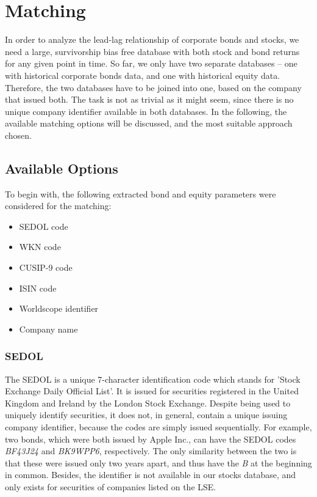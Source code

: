 \chapter{Matching} \label{chapter:matching}
In order to analyze the lead-lag relationship of corporate bonds and stocks, we need a large, survivorship bias free database with both stock and bond returns for any given point in time. So far, we only have two separate databases -- one with historical corporate bonds data, and one with historical equity data. Therefore, the two databases have to be joined into one, based on the company that issued both. The task is not as trivial as it might seem, since there is no unique company identifier available in both databases. In the following, the available matching options will be discussed, and the most suitable approach chosen. 

\section{Available Options} \label{section:available-options}
To begin with, the following extracted bond and equity parameters were considered for the matching: 
\begin{itemize}
	\item SEDOL code
	\item WKN code
	\item CUSIP-9 code
	\item ISIN code
	\item Worldscope identifier
	\item Company name
\end{itemize}

\subsection{SEDOL} %
The SEDOL is a unique 7-character identification code which stands for 'Stock Exchange Daily Official List'. It is issued for securities registered in the United Kingdom and Ireland by the London Stock Exchange. Despite being used to uniquely identify securities, it does not, in general, contain a unique issuing company identifier, because the codes are simply issued sequentially. For example, two bonds, which were both issued by Apple Inc., can have the SEDOL codes \textit{BF43J24} and \textit{BK9WPP6}, respectively. The only similarity between the two is that these were issued only two years apart, and thus have the \textit{B} at the beginning in common. Besides, the identifier is not available in our stocks database, and only exists for securities of companies listed on the LSE. 

